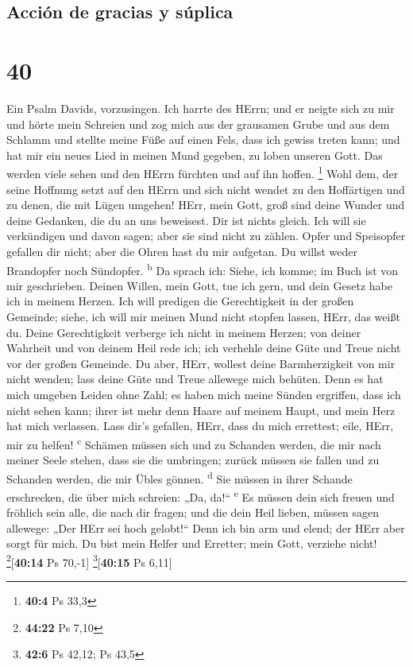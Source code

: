 \hypertarget{acciuxf3n-de-gracias-y-suxfaplica}{%
\subsection{Acción de gracias y
súplica}\label{acciuxf3n-de-gracias-y-suxfaplica}}

\hypertarget{section-39}{%
\section{40}\label{section-39}}

 Ein Psalm Davids, vorzusingen.  Ich harrte
des HErrn; und er neigte sich zu mir und hörte mein Schreien
 und zog mich aus der grausamen Grube und aus dem Schlamm
und stellte meine Füße auf einen Fels, dass ich gewiss treten kann;
 und hat mir ein neues Lied in meinen Mund gegeben, zu
loben unseren Gott. Das werden viele sehen und den HErrn fürchten und
auf ihn hoffen. \footnote{\textbf{40:4} Ps 33,3}  Wohl
dem, der seine Hoffnung setzt auf den HErrn und sich nicht wendet zu den
Hoffärtigen und zu denen, die mit Lügen umgehen!  HErr,
mein Gott, groß sind deine Wunder und deine Gedanken, die du an uns
beweisest. Dir ist nichts gleich. Ich will sie verkündigen und davon
sagen; aber sie sind nicht zu zählen.  Opfer und
Speisopfer gefallen dir nicht; aber die Ohren hast du mir aufgetan. Du
willst weder Brandopfer noch Sündopfer. \textsuperscript{b}
 Da sprach ich: Siehe, ich komme; im Buch ist von mir
geschrieben.  Deinen Willen, mein Gott, tue ich gern, und
dein Gesetz habe ich in meinem Herzen.  Ich will predigen
die Gerechtigkeit in der großen Gemeinde; siehe, ich will mir meinen
Mund nicht stopfen lassen, HErr, das weißt du.  Deine
Gerechtigkeit verberge ich nicht in meinem Herzen; von deiner Wahrheit
und von deinem Heil rede ich; ich verhehle deine Güte und Treue nicht
vor der großen Gemeinde.  Du aber, HErr, wollest deine
Barmherzigkeit von mir nicht wenden; lass deine Güte und Treue allewege
mich behüten.  Denn es hat mich umgeben Leiden ohne Zahl;
es haben mich meine Sünden ergriffen, dass ich nicht sehen kann; ihrer
ist mehr denn Haare auf meinem Haupt, und mein Herz hat mich verlassen.
 Lass dir's gefallen, HErr, dass du mich errettest; eile,
HErr, mir zu helfen! \textsuperscript{c}  Schämen müssen
sich und zu Schanden werden, die mir nach meiner Seele stehen, dass sie
die umbringen; zurück müssen sie fallen und zu Schanden werden, die mir
Übles gönnen. \textsuperscript{d}  Sie müssen in ihrer
Schande erschrecken, die über mich schreien: „Da, da!{}``
\textsuperscript{e}  Es müssen dein sich freuen und
fröhlich sein alle, die nach dir fragen; und die dein Heil lieben,
müssen sagen allewege: „Der HErr sei hoch gelobt!{}`` 
Denn ich bin arm und elend; der HErr aber sorgt für mich. Du bist mein
Helfer und Erretter; mein Gott, verziehe nicht!
\footnote{\textbf{44:22} Ps 7,10}{[}\textbf{40:14} Ps 70,-1{]}
\footnote{\textbf{42:6} Ps 42,12; Ps 43,5}{[}\textbf{40:15} Ps 6,11{]}

